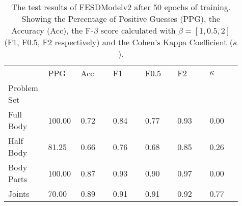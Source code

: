     \begin{table}[!htbp]
        \caption[Test Results of FESDModelv2]{The test results of FESDModelv2 after 50 epochs of training. Showing the Percentage of Positive Guesses (PPG), the Accuracy (Acc), the F-$\beta$ score calculated with $\beta = [1, 0.5, 2]$ (F1, F0.5, F2 respectively) and the Cohen's Kappa Coefficient ($\kappa$).}
        \label{tab:res_v2}
        \begin{tabular}{p{0.13\linewidth}p{0.13\linewidth}p{0.13\linewidth}p{0.13\linewidth}p{0.13\linewidth}p{0.13\linewidth}p{0.13\linewidth}}
\hline
{} &    PPG &  Acc &   F1 &  F0.5 &   F2 &  $\kappa$ \\
Problem Set   &        &      &      &       &      &           \\
\hline
Full Body  & 100.00 & 0.72 & 0.84 &  0.77 & 0.93 &      0.00 \\
Half Body  &  81.25 & 0.66 & 0.76 &  0.68 & 0.85 &      0.26 \\
Body Parts & 100.00 & 0.87 & 0.93 &  0.90 & 0.97 &      0.00 \\
Joints     &  70.00 & 0.89 & 0.91 &  0.91 & 0.92 &      0.77 \\
\hline
\end{tabular}

    \end{table}
  